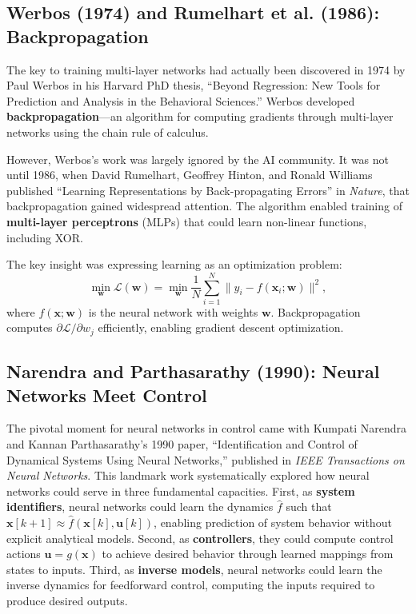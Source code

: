 \subsection{Werbos (1974) and Rumelhart et al. (1986): Backpropagation}

The key to training multi-layer networks had actually been discovered in 1974 by Paul Werbos in his Harvard PhD thesis, ``Beyond Regression: New Tools for Prediction and Analysis in the Behavioral Sciences.'' Werbos developed \textbf{backpropagation}---an algorithm for computing gradients through multi-layer networks using the chain rule of calculus.

However, Werbos's work was largely ignored by the AI community. It was not until 1986, when David Rumelhart, Geoffrey Hinton, and Ronald Williams published ``Learning Representations by Back-propagating Errors'' in \textit{Nature}, that backpropagation gained widespread attention. The algorithm enabled training of \textbf{multi-layer perceptrons} (MLPs) that could learn non-linear functions, including XOR.

The key insight was expressing learning as an optimization problem:
\begin{equation}
\min_{\mathbf{w}} \mathcal{L}(\mathbf{w}) = \min_{\mathbf{w}} \frac{1}{N}\sum_{i=1}^{N} \|y_i - f(\mathbf{x}_i; \mathbf{w})\|^2,
\label{eq:loss_function}
\end{equation}
where $f(\mathbf{x}; \mathbf{w})$ is the neural network with weights $\mathbf{w}$. Backpropagation computes $\partial \mathcal{L}/\partial w_j$ efficiently, enabling gradient descent optimization.

\subsection{Narendra and Parthasarathy (1990): Neural Networks Meet Control}

The pivotal moment for neural networks in control came with Kumpati Narendra and Kannan Parthasarathy's 1990 paper, ``Identification and Control of Dynamical Systems Using Neural Networks,'' published in \textit{IEEE Transactions on Neural Networks}. This landmark work systematically explored how neural networks could serve in three fundamental capacities. First, as \textbf{system identifiers}, neural networks could learn the dynamics $\hat{f}$ such that $\mathbf{x}[k+1] \approx \hat{f}(\mathbf{x}[k], \mathbf{u}[k])$, enabling prediction of system behavior without explicit analytical models. Second, as \textbf{controllers}, they could compute control actions $\mathbf{u} = g(\mathbf{x})$ to achieve desired behavior through learned mappings from states to inputs. Third, as \textbf{inverse models}, neural networks could learn the inverse dynamics for feedforward control, computing the inputs required to produce desired outputs.

